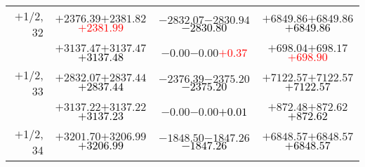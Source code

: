 \documentclass[compress]{beamer}
\begin{document}
\begin{frame}
{\begin{tabular}{r | c | c | c}
$+$1/2, 32 & $+2376.39$\hspace{0.1 cm}$+2381.82$\hspace{0.1 cm}\textcolor{red}{$+2381.99$} & $-2832.07$\hspace{0.1 cm}$-2830.94$\hspace{0.1 cm}\textcolor{black}{$-2830.80$} & $+6849.86$\hspace{0.1 cm}$+6849.86$\hspace{0.1 cm}\textcolor{black}{$+6849.86$} \\
           & $+3137.47$\hspace{0.1 cm}$+3137.47$\hspace{0.1 cm}\textcolor{black}{$+3137.48$} & $-0.00$\hspace{0.1 cm}$-0.00$\hspace{0.1 cm}\textcolor{red}{$+0.37$} & $+698.04$\hspace{0.1 cm}$+698.17$\hspace{0.1 cm}\textcolor{red}{$+698.90$} \\
$+$1/2, 33 & $+2832.07$\hspace{0.1 cm}$+2837.44$\hspace{0.1 cm}\textcolor{black}{$+2837.44$} & $-2376.39$\hspace{0.1 cm}$-2375.20$\hspace{0.1 cm}\textcolor{black}{$-2375.20$} & $+7122.57$\hspace{0.1 cm}$+7122.57$\hspace{0.1 cm}\textcolor{black}{$+7122.57$} \\
           & $+3137.22$\hspace{0.1 cm}$+3137.22$\hspace{0.1 cm}\textcolor{black}{$+3137.23$} & $-0.00$\hspace{0.1 cm}$-0.00$\hspace{0.1 cm}\textcolor{black}{$+0.01$} & $+872.48$\hspace{0.1 cm}$+872.62$\hspace{0.1 cm}\textcolor{black}{$+872.62$} \\
$+$1/2, 34 & $+3201.70$\hspace{0.1 cm}$+3206.99$\hspace{0.1 cm}\textcolor{black}{$+3206.99$} & $-1848.50$\hspace{0.1 cm}$-1847.26$\hspace{0.1 cm}\textcolor{black}{$-1847.26$} & $+6848.57$\hspace{0.1 cm}$+6848.57$\hspace{0.1 cm}\textcolor{black}{$+6848.57$} \\

\end{tabular}}
\end{frame}
\end{document}
